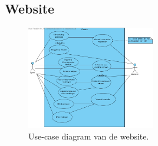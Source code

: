 \subsection{Website}

\begin{figure}[h!]
	\centering
		\includegraphics[width=0.5\textwidth]{images/analyse/ucd_website}
	\caption{Use-case diagram van de website.}
\end{figure}

